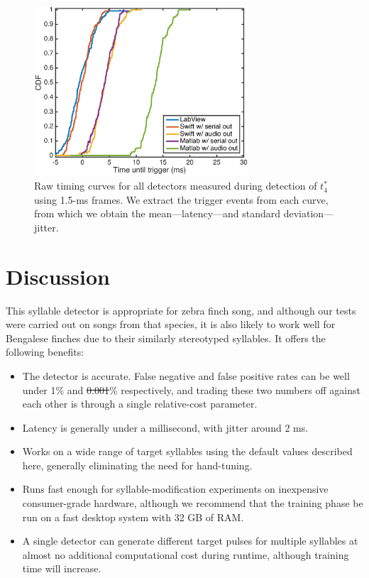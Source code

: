 \documentclass[10pt,letterpaper]{article}
\providecommand{\DIFaddtex}[1]{{\protect\color{blue}\uwave{#1}}} %
\providecommand{\DIFdeltex}[1]{{\protect\color{red}\sout{#1}}}                      %
\providecommand{\DIFaddbegin}{} %
\providecommand{\DIFaddend}{} %
\providecommand{\DIFdelbegin}{} %
\providecommand{\DIFdelend}{} %
\providecommand{\DIFaddFL}[1]{\DIFadd{#1}} %
\providecommand{\DIFaddbeginFL}{} %
\providecommand{\DIFaddendFL}{} %
\providecommand{\DIFadd}[1]{\texorpdfstring{\DIFaddtex{#1}}{#1}} %
\providecommand{\DIFdel}[1]{\texorpdfstring{\DIFdeltex{#1}}{}} %
\begin{document}
\begin{figure}
  \begin{center}
    \includegraphics[width=8cm]{Fig7}
  \end{center}
  \caption{Raw timing curves for all detectors measured during
    detection of \DIFaddbeginFL \DIFaddFL{lny64's }\DIFaddendFL $t^*_4$ using 1.5-ms frames.  We extract the trigger events from each curve, from which we obtain the mean---latency---and
    standard deviation---jitter.}
  \label{fig:timing}
\end{figure}


\section{Discussion}
\label{sec:conclusion}

This syllable detector is appropriate for zebra finch song, and
although our tests were carried out on songs from that species, it is
also likely to work well for Bengalese finches due to their similarly stereotyped syllables.  It offers the
following benefits:
 \begin{itemize} 
\item The detector is accurate. False negative and false positive
  rates can be well under 1\% and \DIFdelbegin \DIFdel{0.001}\DIFdelend \DIFaddbegin \DIFadd{0.005}\DIFaddend \% respectively, and trading
  these two numbers off against each other is through a single
  relative-cost parameter.
\item Latency is generally under a millisecond, with jitter around 2
  ms.
\item Works on a wide range of target syllables using the default
  values described here, generally eliminating the need for
  hand-tuning.
\item Runs fast enough for syllable-modification experiments on
  inexpensive consumer-grade hardware, although we recommend that the
  training phase be run on a fast desktop system with 32 GB of RAM.
\item A single detector can generate different target pulses for
  multiple syllables at almost no additional computational cost during
  runtime, although training time will increase.
 \end{itemize} 
\end{document}
